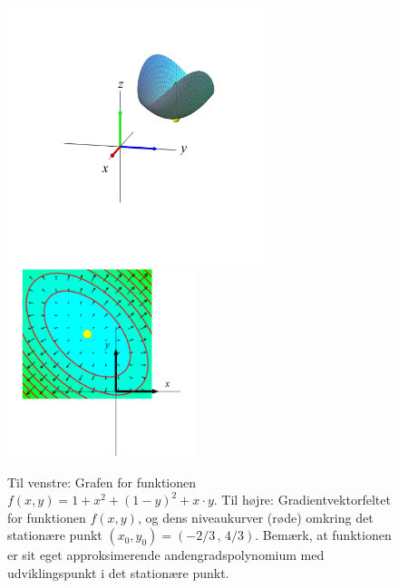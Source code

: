 \begin{figure}[ht]
\centerline{ \includegraphics[height=75mm]{plotVar2Fig4.pdf} \includegraphics[height=55mm]{plotGrad4.pdf} }
\begin{center}
\caption{Til venstre: Grafen for funktionen $f(x,y) = 1+ x^{2} + (1-y)^{2} + x\cdot y $.  Til højre: Gradientvektorfeltet for funktionen $f(x,y)$, og dens niveaukurver (røde) omkring det stationære punkt $(x_{0}, y_{0}) = (-2/3 \, , \, 4/3)$. Bemærk, at funktionen er sit eget approksimerende andengradspolynomium med udviklingspunkt i det stationære punkt.} \label{figStatInspec2}
\end{center}
\end{figure}





